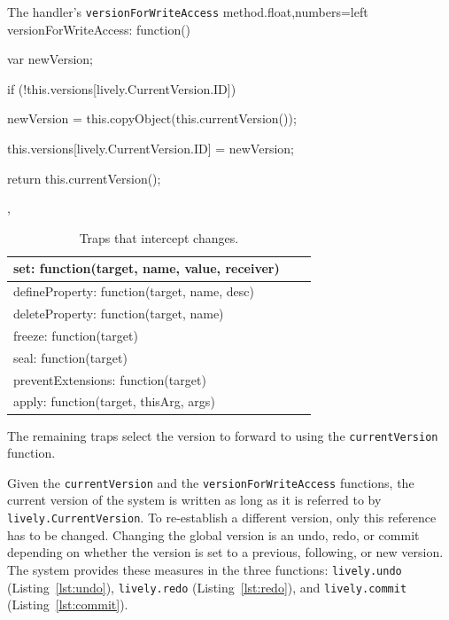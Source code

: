 \begin{code}{The handler's \lstinline{versionForWriteAccess} method.}{float,numbers=left}
versionForWriteAccess: function() {
    var newVersion;
    
    if (!this.versions[lively.CurrentVersion.ID]) {
        newVersion = this.copyObject(this.currentVersion());
        
        this.versions[lively.CurrentVersion.ID] = newVersion;
    }
    
    return this.currentVersion();
},
\end{code}
\iffalse
\end{verbatim}\fi

\begin{table}[h]
\begin{center}
\begin{tabular}{|l|l|r|}
\hline
set: function(target, name, value, receiver) \\ \hline
defineProperty: function(target, name, desc) \\ \hline
deleteProperty: function(target, name) \\ \hline
freeze: function(target) \\ \hline
seal: function(target) \\ \hline
preventExtensions: function(target) \\ \hline
apply: function(target, thisArg, args) \\ \hline
\end{tabular}
\caption[Table caption text]{Traps that intercept changes.}
\label{table:writeTraps}
\end{center}
\end{table}

The remaining traps select the version to forward to using the \lstinline{currentVersion} function.

Given the \lstinline{currentVersion} and the \lstinline{versionForWriteAccess} functions, the current version of the system is written as long as it is referred to by \lstinline{lively.CurrentVersion}.
To re-establish a different version, only this reference has to be changed.
Changing the global version is an undo, redo, or commit depending on whether the version is set to a previous, following, or new version.
The system provides these measures in the three functions: \lstinline{lively.undo} (Listing~\ref{lst:undo}), \lstinline{lively.redo} (Listing~\ref{lst:redo}), and \lstinline{lively.commit} (Listing~\ref{lst:commit}).

